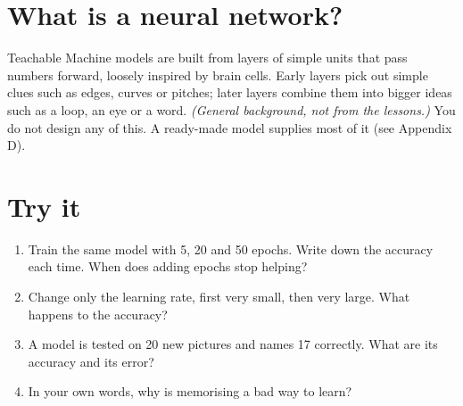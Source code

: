 \section{What is a neural network?}

Teachable Machine models are built from layers of simple units that pass numbers forward, loosely inspired by brain cells. Early layers pick out simple clues such as edges, curves or pitches; later layers combine them into bigger ideas such as a loop, an eye or a word. \emph{(General background, not from the lessons.)} You do not design any of this. A ready-made model supplies most of it (see Appendix D).


\section{Try it}

\begin{enumerate}
\item Train the same model with 5, 20 and 50 epochs. Write down the accuracy each time. When does adding epochs stop helping?
\item Change only the learning rate, first very small, then very large. What happens to the accuracy?
\item A model is tested on 20 new pictures and names 17 correctly. What are its accuracy and its error?
\item In your own words, why is memorising a bad way to learn?
\end{enumerate}
